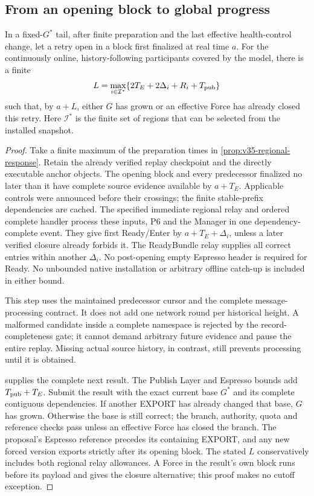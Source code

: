 \subsection{From an opening block to global progress}
\label{sec:v35-global-progress}
\begin{proposition}
\label{prop:v35-public-response}
In a fixed-$G^*$ tail, after finite preparation and the last effective
health-control change, let a retry open in a block first finalized at
real time $a$. For the continuously online, history-following participants
covered by the model, there is a finite
\[
 L=\max_{i\in\mathcal I^*}
       \{2T_E+2\Delta_i+R_i+T_{\rm pub}\}
\]
such that, by $a+L$, either $G$ has grown or an effective Force has
already closed this retry. Here $\mathcal I^*$ is the finite set of
regions that can be selected from the installed snapshot.
\end{proposition}
\begin{proof}
Take a finite maximum of the preparation times in
\cref{prop:v35-regional-response}. Retain the already verified replay
checkpoint and the directly executable anchor objects. The opening
block and every predecessor finalized no later than it have complete
source evidence available by $a+T_E$. Applicable controls were announced
before their crossings; the finite stable-prefix dependencies are
cached. The specified immediate regional  relay and
ordered complete handler process these inputs, P6 and the Manager in
one dependency-complete event. They give first Ready/Enter by
$a+T_E+\Delta_i$, unless a later verified closure already forbids it.
The ReadyBundle relay supplies all correct entries within another
$\Delta_i$. No post-opening empty Espresso header is required for
Ready. No unbounded native installation or arbitrary offline catch-up
is included in either bound.

This step uses the maintained predecessor cursor and the complete
message-processing contract. It does not add one network round per
historical height. A malformed candidate inside a complete namespace
is rejected by the record-completeness gate; it cannot demand arbitrary
future evidence and pause the entire replay. Missing actual source
history, in contrast, still prevents processing until it is obtained.

 supplies the complete next result.
The Publish Layer and Espresso bounds add $T_{\rm pub}+T_E$. Submit
the result with the exact current base $G^*$ and its complete contiguous
dependencies. If another EXPORT has already changed that base, $G$
has grown. Otherwise the base is still correct; the branch, authority,
quota and reference checks pass unless an effective Force has closed
the branch. The proposal's Espresso reference precedes its containing
EXPORT, and any new forced version exports strictly after its opening
block. The stated $L$ conservatively includes both regional relay
allowances. A Force in the result's own block runs before its payload
and gives the closure alternative; this proof makes no cutoff exception.
\end{proof}

